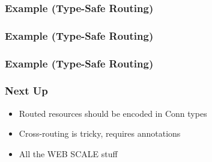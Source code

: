 \begin{frame}
\end{frame}

\begin{frame}
  \frametitle{Example (Type-Safe Routing)}
  
\end{frame}

\begin{frame}
  \frametitle{Example (Type-Safe Routing)}
  
\end{frame}

\begin{frame}
  \frametitle{Example (Type-Safe Routing)}
  
\end{frame}

\begin{frame}
\end{frame}

\begin{frame}
\end{frame}

\begin{frame}
  \frametitle{Next Up}
  \begin{itemize}
    \item Routed resources should be encoded in Conn types
    \item Cross-routing is tricky, requires annotations
    \item All the WEB SCALE stuff
  \end{itemize}
\end{frame}

\begin{frame}
\end{frame}

\begin{frame}
  \titlepage
\end{frame}

